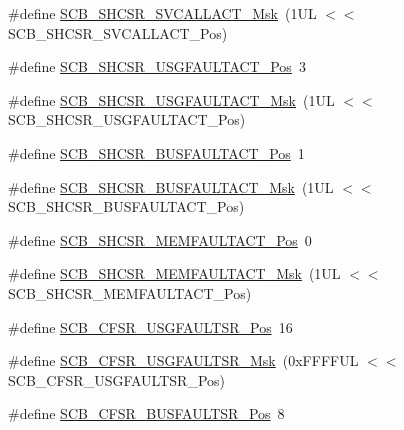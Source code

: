 \begin{DoxyCompactItemize}
\item 
\#define \hyperlink{group___c_m_s_i_s___s_c_b_ga634c0f69a233475289023ae5cb158fdf}{\-S\-C\-B\-\_\-\-S\-H\-C\-S\-R\-\_\-\-S\-V\-C\-A\-L\-L\-A\-C\-T\-\_\-\-Msk}~(1\-U\-L $<$$<$ S\-C\-B\-\_\-\-S\-H\-C\-S\-R\-\_\-\-S\-V\-C\-A\-L\-L\-A\-C\-T\-\_\-\-Pos)
\item 
\#define \hyperlink{group___c_m_s_i_s___s_c_b_gae06f54f5081f01ed3f6824e451ad3656}{\-S\-C\-B\-\_\-\-S\-H\-C\-S\-R\-\_\-\-U\-S\-G\-F\-A\-U\-L\-T\-A\-C\-T\-\_\-\-Pos}~3
\item 
\#define \hyperlink{group___c_m_s_i_s___s_c_b_gab3166103b5a5f7931d0df90949c47dfe}{\-S\-C\-B\-\_\-\-S\-H\-C\-S\-R\-\_\-\-U\-S\-G\-F\-A\-U\-L\-T\-A\-C\-T\-\_\-\-Msk}~(1\-U\-L $<$$<$ S\-C\-B\-\_\-\-S\-H\-C\-S\-R\-\_\-\-U\-S\-G\-F\-A\-U\-L\-T\-A\-C\-T\-\_\-\-Pos)
\item 
\#define \hyperlink{group___c_m_s_i_s___s_c_b_gaf272760f2df9ecdd8a5fbbd65c0b767a}{\-S\-C\-B\-\_\-\-S\-H\-C\-S\-R\-\_\-\-B\-U\-S\-F\-A\-U\-L\-T\-A\-C\-T\-\_\-\-Pos}~1
\item 
\#define \hyperlink{group___c_m_s_i_s___s_c_b_ga9d7a8b1054b655ad08d85c3c535d4f73}{\-S\-C\-B\-\_\-\-S\-H\-C\-S\-R\-\_\-\-B\-U\-S\-F\-A\-U\-L\-T\-A\-C\-T\-\_\-\-Msk}~(1\-U\-L $<$$<$ S\-C\-B\-\_\-\-S\-H\-C\-S\-R\-\_\-\-B\-U\-S\-F\-A\-U\-L\-T\-A\-C\-T\-\_\-\-Pos)
\item 
\#define \hyperlink{group___c_m_s_i_s___s_c_b_ga7c856f79a75dcc1d1517b19a67691803}{\-S\-C\-B\-\_\-\-S\-H\-C\-S\-R\-\_\-\-M\-E\-M\-F\-A\-U\-L\-T\-A\-C\-T\-\_\-\-Pos}~0
\item 
\#define \hyperlink{group___c_m_s_i_s___s_c_b_ga9147fd4e1b12394ae26eadf900a023a3}{\-S\-C\-B\-\_\-\-S\-H\-C\-S\-R\-\_\-\-M\-E\-M\-F\-A\-U\-L\-T\-A\-C\-T\-\_\-\-Msk}~(1\-U\-L $<$$<$ S\-C\-B\-\_\-\-S\-H\-C\-S\-R\-\_\-\-M\-E\-M\-F\-A\-U\-L\-T\-A\-C\-T\-\_\-\-Pos)
\item 
\#define \hyperlink{group___c_m_s_i_s___s_c_b_gac8e4197b295c8560e68e2d71285c7879}{\-S\-C\-B\-\_\-\-C\-F\-S\-R\-\_\-\-U\-S\-G\-F\-A\-U\-L\-T\-S\-R\-\_\-\-Pos}~16
\item 
\#define \hyperlink{group___c_m_s_i_s___s_c_b_ga565807b1a3f31891f1f967d0fa30d03f}{\-S\-C\-B\-\_\-\-C\-F\-S\-R\-\_\-\-U\-S\-G\-F\-A\-U\-L\-T\-S\-R\-\_\-\-Msk}~(0x\-F\-F\-F\-F\-U\-L $<$$<$ S\-C\-B\-\_\-\-C\-F\-S\-R\-\_\-\-U\-S\-G\-F\-A\-U\-L\-T\-S\-R\-\_\-\-Pos)
\item 
\#define \hyperlink{group___c_m_s_i_s___s_c_b_ga555a24f4f57d199f91d1d1ab7c8c3c8a}{\-S\-C\-B\-\_\-\-C\-F\-S\-R\-\_\-\-B\-U\-S\-F\-A\-U\-L\-T\-S\-R\-\_\-\-Pos}~8
\item 
$$
\end{DoxyCompactItemize}
